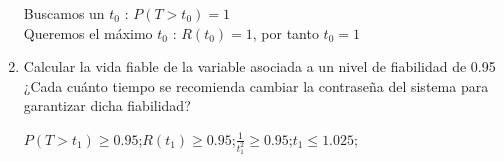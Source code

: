 \begin{enumerate}
\begin{tcolorbox}[colback=white,colframe=cyan!50!black,fonttitle=\bfseries]
    Buscamos un $t_0$ : $P(T>t_0)=1$\\
    Queremos el máximo $t_0$ : $R(t_0)=1$, por tanto $t_0 = 1$
    \end{tcolorbox}
    \item Calcular la vida fiable de la variable asociada a un nivel de fiabilidad de 0.95 ¿Cada cuánto tiempo se recomienda cambiar la contraseña del sistema para garantizar dicha fiabilidad?
    \begin{tcolorbox}[colback=white,colframe=cyan!50!black,fonttitle=\bfseries]
    $P(T>t_1)\geq0.95$;\hspace{.5cm}$R(t_1)\geq0.95$;\hspace{.5cm}$\frac{1}{t^2_1}\geq0.95$;\hspace{.5cm}$t_1\leq 1.025$; 
    \end{tcolorbox}
\end{enumerate}

